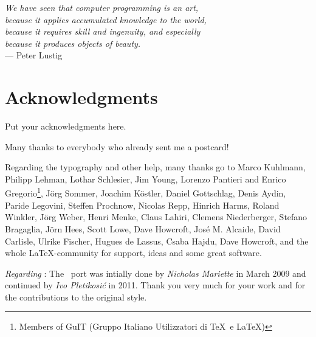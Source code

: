 
\begin{flushright}{\slshape
    We have seen that computer programming is an art, \\
    because it applies accumulated knowledge to the world, \\
    because it requires skill and ingenuity, and especially \\
    because it produces objects of beauty.} \\ \medskip
    --- Peter Lustig
\end{flushright}



\bigskip

\begingroup
\let\clearpage\relax
\let\cleardoublepage\relax
\let\cleardoublepage\relax
\chapter*{Acknowledgments}
Put your acknowledgments here.

Many thanks to everybody who already sent me a postcard!

Regarding the typography and other help, many thanks go to Marco
Kuhlmann, Philipp Lehman, Lothar Schlesier, Jim Young, Lorenzo
Pantieri and Enrico Gregorio\footnote{Members of GuIT (Gruppo
Italiano Utilizzatori di \TeX\ e \LaTeX )}, J\"org Sommer,
Joachim K\"ostler, Daniel Gottschlag, Denis Aydin, Paride
Legovini, Steffen Prochnow, Nicolas Repp, Hinrich Harms,
Roland Winkler, Jörg Weber, Henri Menke, Claus Lahiri,
Clemens Niederberger, Stefano Bragaglia, Jörn Hees,
Scott Lowe, Dave Howcroft, Jos\'e M. Alcaide, David Carlisle,
Ulrike Fischer, Hugues de Lassus, Csaba Hajdu, Dave Howcroft,
and the whole \LaTeX-community for support, ideas and
some great software.

\bigskip

\noindent\emph{Regarding \mLyX}: The \mLyX\ port was intially done by
\emph{Nicholas Mariette} in March 2009 and continued by
\emph{Ivo Pletikosi\'c} in 2011. Thank you very much for your
work and for the contributions to the original style.


\endgroup
